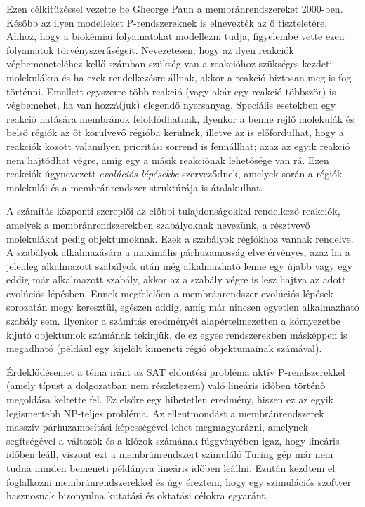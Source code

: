 Ezen célkitűzéssel vezette be Gheorge Paun a membránrendszereket 2000-ben. Később az ilyen modelleket P-rendszereknek is elnevezték az ő tiszteletére. Ahhoz, hogy a biokémiai folyamatokat modellezni tudja, figyelembe vette ezen folyamatok törvényszerűségeit. Nevezetesen, hogy az ilyen reakciók végbemeneteléhez kellő számban szükség van a reakcióhoz szükséges kezdeti molekulákra és ha ezek rendelkezésre állnak, akkor a reakció biztosan meg is fog történni. Emellett egyszerre több reakció (vagy akár egy reakció többször) is végbemehet, ha van hozzá(juk) elegendő nyersanyag. Speciális esetekben egy reakció hatására membránok feloldódhatnak, ilyenkor a benne rejlő molekulák és belső régiók az őt körülvevő régióba kerülnek, illetve az is előfordulhat, hogy a reakciók között valamilyen prioritási sorrend is fennállhat; azaz az egyik reakció nem hajtódhat végre, amíg egy a másik reakciónak lehetősége van rá. Ezen reakciók úgynevezett \textit{evolúciós lépésekbe} szerveződnek, amelyek során a régiók molekulái és a membránrendszer struktúrája is átalakulhat.

A számítás központi szereplői az előbbi tulajdonságokkal rendelkező reakciók, amelyek a membránrendszerekben szabályoknak nevezünk, a résztvevő molekulákat pedig objektumoknak. Ezek a szabályok régiókhoz vannak rendelve. A szabályok alkalmazására a maximális párhuzamosság elve érvényes, azaz ha a jelenleg alkalmazott szabályok után még alkalmazható lenne egy újabb vagy egy eddig már alkalmazott szabály, akkor az a szabály végre is lesz hajtva az adott evolúciós lépésben. Ennek megfelelően a membránrendszer evolúciós lépések sorozatán megy keresztül, egészen addig, amíg már nincsen egyetlen alkalmazható szabály sem. Ilyenkor a számítás eredményét alapértelmezetten a környezetbe kijutó objektumok számának tekinjük, de ez egyes rendszerekben másképpen is megadható (például egy kijelölt kimeneti régió objektumainak számával).

Érdeklődésemet a téma iránt az SAT eldöntési probléma aktív P-rendszerekkel (amely típust a dolgozatban nem részletezem) való lineáris időben történő megoldása keltette fel. Ez elsőre egy hihetetlen eredmény, hiszen ez az egyik legismertebb NP-teljes probléma. Az ellentmondást a membránrendszerek masszív párhuzamosítási képességével lehet megmagyarázni, amelynek segítségével a változók és a klózok számának függvényében igaz, hogy lineáris időben leáll, viszont ezt a membránrendszert szimuláló Turing gép már nem tudna minden bemeneti példányra lineáris időben leállni. Ezután kezdtem el foglalkozni membránrendszerekkel és úgy éreztem, hogy egy szimulációs szoftver hasznosnak bizonyulna kutatási és oktatási célokra egyaránt.


